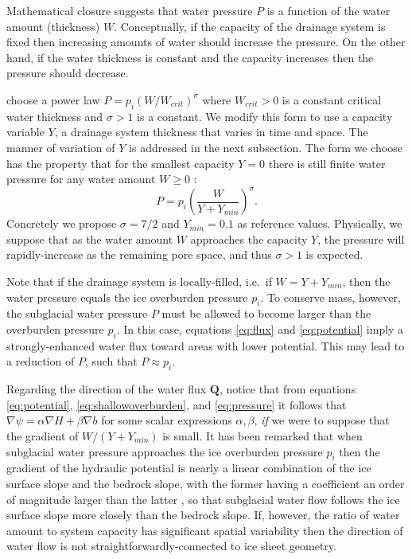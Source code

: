 \documentclass[11pt]{amsart}
\newcommand{\bQ}{\mathbf{Q}}
\begin{document}
Mathematical closure suggests that water pressure $P$ is a function of the water amount (thickness) $W$.  Conceptually, if the capacity of the drainage system is fixed then increasing amounts of water should increase the pressure.  On the other hand, if the water thickness is constant and the capacity increases then the pressure should decrease.  

\citet[equation (30)]{FlowersClarke2002_theory} choose a power law $P = p_i (W/W_{crit})^\sigma$ where $W_{crit}>0$ is a constant critical water thickness and $\sigma>1$ is a constant.  We modify this form to use a capacity variable $Y$, a drainage system thickness that varies in time and space.  The manner of variation of $Y$ is addressed in the next subsection.  The form we choose has the property that for the smallest capacity $Y=0$ there is still finite water pressure for any water amount $W\ge 0$ : 
\begin{equation} \label{eq:pressure}
P = p_i \left( \frac{W}{Y+Y_{min}} \right)^\sigma.
\end{equation}
Concretely we propose $\sigma=7/2$ \citep{FlowersClarke2002_theory} and $Y_{min}=0.1$ as reference values.  Physically, we suppose that as the water amount $W$ approaches the capacity $Y$, the pressure will rapidly-increase as the remaining pore space, and thus $\sigma>1$ is expected.

Note that if the drainage system is locally-filled, i.e.~if $W=Y+Y_{min}$, then the water pressure equals the ice overburden pressure $p_i$.  To conserve mass, however, the subglacial water pressure $P$ must be allowed to become larger than the overburden pressure $p_i$.  In this case, equations \eqref{eq:flux} and \eqref{eq:potential} imply a strongly-enhanced water flux toward areas with lower potential.  This may lead to a reduction of $P$, such that $P \approx p_i$.

Regarding the direction of the water flux $\bQ$, notice that from equations \eqref{eq:potential}, \eqref{eq:shallowoverburden}, and \eqref{eq:pressure} it follows that $\nabla \psi = \alpha \nabla H + \beta \nabla b$ for some scalar expressions $\alpha,\beta$, \emph{if} we were to suppose that the gradient of $W/(Y+Y_{min})$ is small.  It has been remarked that when subglacial water pressure approaches the ice overburden pressure $p_i$ then the gradient of the hydraulic potential is nearly a linear combination of the ice surface slope and the bedrock slope, with the former having a coefficient an order of magnitude larger than the latter \citep{Clarke05}, so that subglacial water flow follows the ice surface slope more closely than the bedrock slope.  If, however, the ratio of water amount to system capacity has significant spatial variability then the direction of water flow is not straightforwardly-connected to ice sheet geometry.
\end{document}
